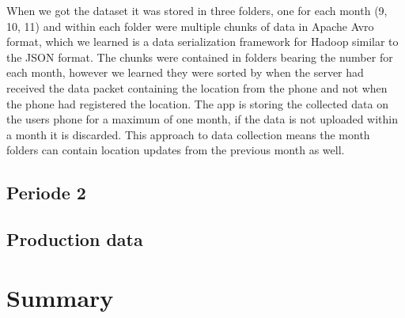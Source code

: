 When we got the dataset it was stored in three folders, one for each month (9, 10, 11) and within each folder were multiple chunks of data in Apache Avro format\cite{apacheavro}, which we learned is a data serialization framework for Hadoop similar to the JSON format. The chunks were contained in folders bearing the number for each month, however we learned they were sorted by when the server had received the data packet containing the location from the phone and not when the phone had registered the location. The app is storing the collected data on the users phone for a maximum of one month, if the data is not uploaded within a month it is discarded. This approach to data collection means the month folders can contain location updates from the previous month as well.


\subsection{Periode 2}

\subsection{Production data}
\section{Summary}